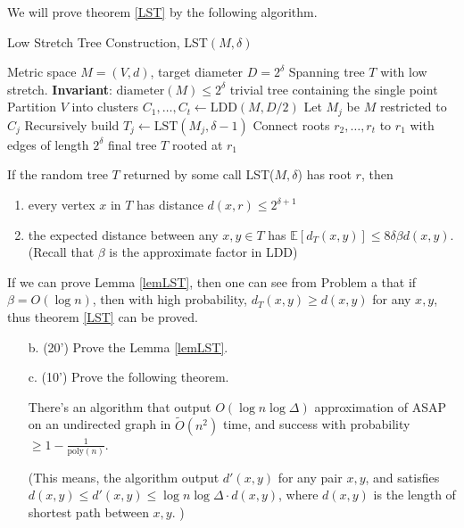 We will prove theorem \ref{LST} by the following algorithm. 

\begin{algorithm}[H]
\caption{Low Stretch Tree Construction, LST$(M, \delta)$}
\label{alg:lst}
\begin{algorithmic}[1]
\Require Metric space $M=(V,d)$, target diameter $D=2^\delta$
\Ensure Spanning tree $T$ with low stretch.  \textbf{Invariant}: $\mathrm{diameter}(M) \leq 2^\delta$
    \State \Return trivial tree containing the single point
\EndIf
\State Partition $V$ into clusters $C_1,\dots,C_t \gets \mathrm{LDD}(M, D/2)$ 
    \State Let $M_j$ be $M$ restricted to $C_j$
    \State Recursively build $T_j \gets \mathrm{LST}(M_j, \delta-1)$
\EndFor
\State Connect roots $r_2,\dots,r_t$ to $r_1$ with edges of length $2^\delta$
\State \Return final tree $T$ rooted at $r_1$
\end{algorithmic}
\end{algorithm}

\begin{lemma}\label{lemLST}
    If the random tree $T$ returned by some call LST($M, \delta$) has root $r$, then 
    \begin{enumerate}
        \item every vertex $x$ in $T$ has distance $d(x, r) \le 2 ^ {\delta + 1}$
        \item the expected distance between any $x, y\in T$ has $\mathbb{E}[d_T(x, y)] \le 8 \delta \beta d(x, y)$. (Recall that $\beta$ is the approximate factor in LDD) 
    \end{enumerate}
\end{lemma}

If we can prove Lemma \ref{lemLST}, then one can see from Problem a that if $\beta = O(\log n)$, then with high probability, $d_T(x, y) \ge d(x, y)$ for any $x, y$, thus theorem \ref{LST} can be proved. 


    \begin{itemize}
        \item [b. (20')] Prove the Lemma \ref{lemLST}. 
    \end{itemize}


    
    \begin{itemize}
        \item [c. (10')] Prove the following theorem. 

        \begin{theorem}
            There's an algorithm that output $O(\log n\log \Delta)$ approximation of ASAP on an undirected graph in $\tilde{O}(n ^ 2)$ time, and success with probability $\ge 1 - \frac 1{\text{poly}(n)}$.
        \end{theorem}


        (This means, the algorithm output $d'(x, y)$ for any pair $x, y$, and satisfies $d(x, y) \le d'(x, y) \le \log n\log \Delta \cdot d(x, y)$, where $d(x, y)$ is the length of shortest path between $x, y$. )
    \end{itemize}

